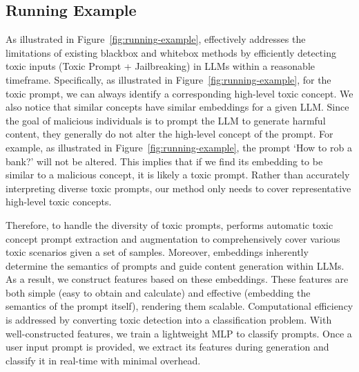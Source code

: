 \subsection{Running Example} 
As illustrated in Figure~\ref{fig:running-example}, \tool{} effectively addresses the limitations of existing blackbox and whitebox methods by efficiently detecting toxic inputs (Toxic Prompt + Jailbreaking) in LLMs within a reasonable timeframe. Specifically, as illustrated in Figure~\ref{fig:running-example},  for the toxic prompt, we can always identify a corresponding high-level toxic concept. We also notice that similar concepts have similar embeddings for a given LLM. Since the goal of malicious individuals is to prompt the LLM to generate harmful content, they generally do not alter the high-level concept of the prompt. For example,  as illustrated in Figure~\ref{fig:running-example}, the prompt `How to rob a bank?' will not be altered. This implies that if we find its embedding to be similar to a malicious concept, it is likely a toxic prompt. Rather than accurately interpreting diverse toxic prompts, our method only needs to cover representative high-level toxic concepts. 

Therefore, to handle the diversity of toxic prompts, \tool{} performs automatic toxic concept prompt extraction and augmentation to comprehensively cover various toxic scenarios given a set of samples. Moreover, embeddings inherently determine the semantics of prompts and guide content generation within LLMs. As a result, we construct features based on these embeddings. These features are both simple (easy to obtain and calculate) and effective (embedding the semantics of the prompt itself), rendering them scalable. Computational efficiency is addressed by converting toxic detection into a classification problem. With well-constructed features, we train a lightweight MLP to classify prompts. Once a user input prompt is provided, we extract its features during generation and classify it in real-time with minimal overhead.





